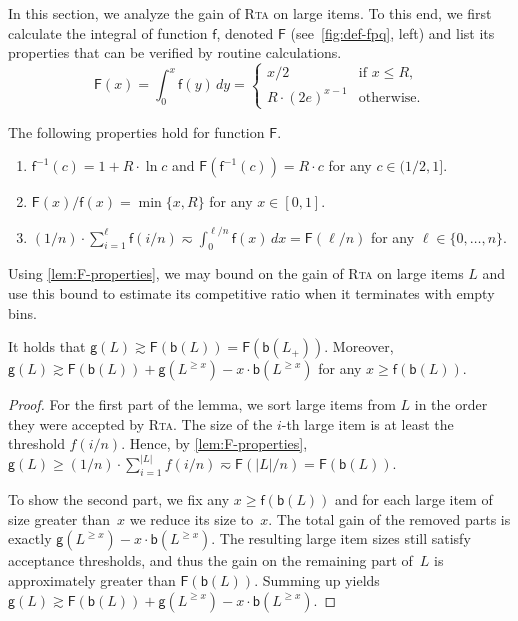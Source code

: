 \documentclass[a4paper,USenglish,cleveref]{lipics-v2019}
\newcommand{\R}{\ensuremath{R}}
\newcommand{\LG}{\ensuremath{L}\xspace}
\newcommand{\LT}{\ensuremath{L_+}\xspace}
\newcommand{\f}{\textsf{f}}
\newcommand{\fintegral}{\textsf{F}}
\newcommand{\B}{\textsf{b}}
\newcommand{\gain}{\textsf{g}}
\newcommand{\ALG}{\textsc{Rta}\xspace}
\begin{document}
In this section, we analyze the gain of \ALG on large items. To this end, we
first calculate the integral of function $\f$, denoted $\fintegral$
(see~\cref{fig:def-fpq}, left) and list its properties that can be verified by
routine calculations. 
%
\begin{equation}
\fintegral(x) = \int_0^x \f(y)\, dy =
  \begin{cases}
    x/2 & \mbox{if } x \leq \R,\\
    \R\cdot(2e)^{x-1} & \mbox{otherwise.}
  \end{cases}
  \label{eq:Ff}
\end{equation}

\begin{lemma}
\label{lem:F-properties}
The following properties hold for function $\fintegral$. 
\begin{enumerate}
  \item $\f^{-1}(c) = 1 + \R \cdot \ln c$ and 
  $\fintegral(\f^{-1}(c)) =  \R \cdot c$ 
  for any $c \in (1/2,1]$.
\item $\fintegral(x) / \f(x) = \min \{x,\R\}$ for any $x \in [0,1]$.
\item $(1/n) \cdot \sum_{i=1}^\ell \f(i/n) \eqsim \int_0^{\ell/n} \f(x)\, dx = \fintegral(\ell/n)$
for any $\ell \in \{0, \ldots, n\}$.
\end{enumerate}
\end{lemma}

Using \cref{lem:F-properties}, we may bound on the gain of \ALG on large items $L$
and use this bound to estimate its competitive ratio when it terminates with empty bins.

\begin{lemma}
\label{lem:large-gain}
It holds that $\gain(\LG) \gtrsim \fintegral(\B(\LG)) = \fintegral(\B(\LT))$. Moreover, $\gain(\LG)
\gtrsim \fintegral(\B(\LG)) + \gain(\LG^{\geq x}) - x \cdot \B(\LG^{\geq x})$
for any $x \geq \f(\B(\LG))$.
\end{lemma}

\begin{proof}
For the first part of the lemma, we sort large
items from $L$ in the order they were accepted by \ALG. The size of the $i$-th
large item is at least the threshold $f(i/n)$. Hence, by
\cref{lem:F-properties}, $\gain(L) \geq (1/n) \cdot \sum_{i=1}^{|L|} f(i/n)
\eqsim \fintegral(|L|/n) = \fintegral(\B(\LG))$.
\todo{Additionally claim that $\fintegral(\B(\LG)) = \fintegral(\B(\LT))$}

To show the second part, we fix any $x \geq \f(\B(\LG))$ and for each large item
of size greater than~$x$ we reduce its size to~$x$. The total gain of the
removed parts is exactly $\gain(\LG^{\geq x}) - x \cdot \B(\LG^{\geq x})$. The
resulting large item sizes still satisfy acceptance thresholds, and thus the
gain on the remaining part of~$\LG$ is approximately greater than
$\fintegral(\B(\LG))$. Summing up yields $\gain(\LG) \gtrsim
\fintegral(\B(\LG)) + \gain(\LG^{\geq x}) - x \cdot \B(\LG^{\geq x})$.
\end{proof}
\end{document}
